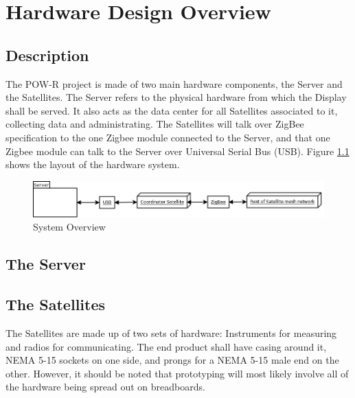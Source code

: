 
\chapter{Hardware Design Overview}

\section{Description}

The POW-R project is made of two main hardware components, the Server and the Satellites. The Server refers to the physical hardware from which the Display shall be served. It also acts as the data center for all Satellites associated to it, collecting data and administrating. The Satellites will talk over ZigBee specification to the one Zigbee module connected to the Server, and that one Zigbee module can talk to the Server over Universal Serial Bus (USB). Figure \ref{SystemOverview} shows the layout of the hardware system.


\begin{figure}
\centering
\includegraphics[scale=0.3]{Hardware/images/SystemOverview.png}
\caption{System Overview}
\label{SystemOverview}
\end{figure}

\section{The Server}




\section{The Satellites}
The Satellites are made up of two sets of hardware: Instruments for measuring and radios for communicating. The end product shall have casing around it, NEMA 5-15 sockets on one side, and prongs for a NEMA 5-15 male end on the other. However, it should be noted that prototyping will most likely involve all of the hardware being spread out on breadboards.


